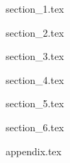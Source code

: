\documentclass[a4paper,12pt]{report}
\begin{document}
	


\pagebreak
\tableofcontents
\pagebreak

\setcounter{page}{1}

{section_1.tex}

{section_2.tex}

{section_3.tex}

{section_4.tex}

{section_5.tex}

{section_6.tex}

\newpage

\printbibliography[title={References}, heading=bibsection]

\newpage

{appendix.tex}
\end{document}

